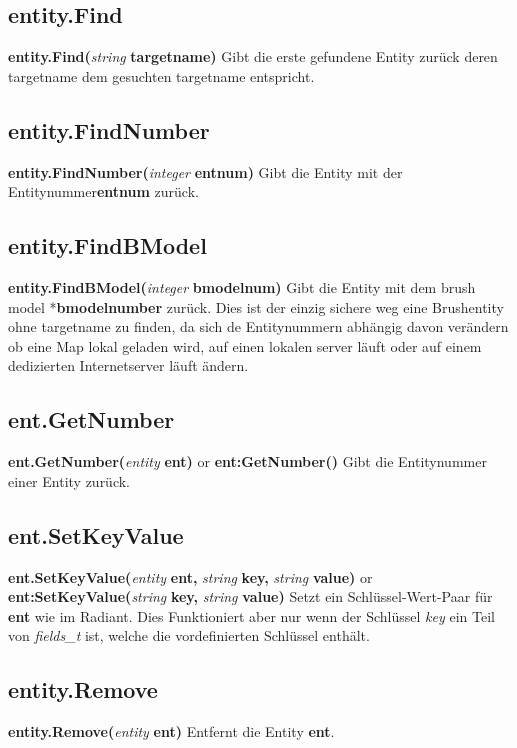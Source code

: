 \documentclass[11pt,a4paper]{book}
\begin{document}
\subsection{entity.Find}
\label{enty-find}
\textbf{entity.Find(}\textit{string}\textbf{ targetname)}
\newline
Gibt die erste gefundene Entity zurück deren targetname dem gesuchten targetname entspricht.
\subsection{entity.FindNumber}
\label{enty.findnumber}
\textbf{entity.FindNumber(}\textit{integer}\textbf{ entnum)}
\newline
Gibt die Entity mit der Entitynummer\textbf{entnum} zurück.
\subsection{entity.FindBModel}
\label{enty-findbmodel}
\textbf{entity.FindBModel(}\textit{integer}\textbf{ bmodelnum)}
\newline
Gibt die Entity mit dem brush model *\textbf{bmodelnumber} zurück. Dies ist der einzig sichere weg eine Brushentity ohne targetname zu finden, da sich de Entitynummern abhängig davon verändern ob eine Map lokal geladen wird, auf einen lokalen server läuft oder auf einem dedizierten Internetserver läuft ändern.
\subsection{ent.GetNumber}
\label{enty-getnumber}
\textbf{ent.GetNumber(}\textit{entity}\textbf{ ent)} or \textbf{ent:GetNumber()}
\newline
Gibt die Entitynummer einer Entity zurück.
\subsection{ent.SetKeyValue}
\label{enty-setkeyvalue}
\textbf{ent.SetKeyValue(}\textit{entity}\textbf{ ent, }\textit{string}\textbf{ key, }\textit{string}\textbf{ value)} or \textbf{ent:SetKeyValue(}\textit{string}\textbf{ key, }\textit{string}\textbf{ value)}
\newline
Setzt ein Schlüssel-Wert-Paar für \textbf{ent} wie im Radiant. Dies Funktioniert aber nur wenn der Schlüssel \textit{key} ein Teil von \textit{fields\_t} ist, welche die vordefinierten Schlüssel enthält.
\subsection{entity.Remove}
\label{enty-remove}
\textbf{entity.Remove(}\textit{entity}\textbf{ ent)}
\newline
Entfernt die Entity \textbf{ent}.
\end{document}
